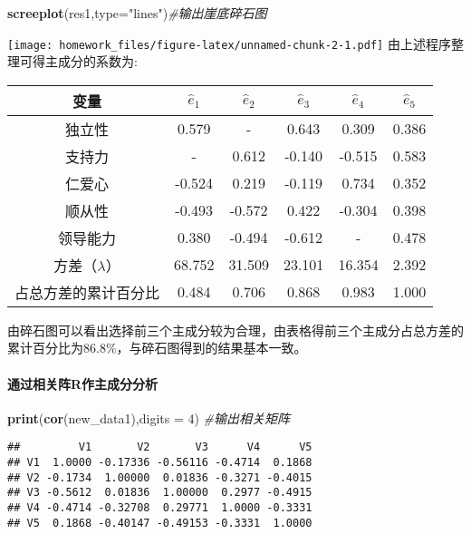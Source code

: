 \documentclass[
]{article}
\newenvironment{Shaded}{\begin{snugshade}}{\end{snugshade}}
\newcommand{\CommentTok}[1]{\textcolor[rgb]{0.56,0.35,0.01}{\textit{#1}}}
\newcommand{\DataTypeTok}[1]{\textcolor[rgb]{0.13,0.29,0.53}{#1}}
\newcommand{\DecValTok}[1]{\textcolor[rgb]{0.00,0.00,0.81}{#1}}
\newcommand{\KeywordTok}[1]{\textcolor[rgb]{0.13,0.29,0.53}{\textbf{#1}}}
\newcommand{\NormalTok}[1]{#1}
\newcommand{\StringTok}[1]{\textcolor[rgb]{0.31,0.60,0.02}{#1}}
\begin{document}
\begin{Shaded}
\begin{Highlighting}[]
\KeywordTok{screeplot}\NormalTok{(res1,}\DataTypeTok{type=}\StringTok{"lines"}\NormalTok{)}\CommentTok{#输出崖底碎石图}
\end{Highlighting}
\end{Shaded}

\texttt{[image: homework\_files/figure-latex/unnamed-chunk-2-1.pdf]}
由上述程序整理可得主成分的系数为:

\begin{longtable}[]{@{}cccccc@{}}
\toprule
变量 & \(\hat{e}_{1}\) & \(\hat{e}_{2}\) & \(\hat{e}_{3}\) & \(\hat{e}_{4}\) &
\(\hat{e}_{5}\)\tabularnewline
\midrule
\endhead
独立性 & 0.579 & - & 0.643 & 0.309 & 0.386\tabularnewline
支持力 & - & 0.612 & -0.140 & -0.515 & 0.583\tabularnewline
仁爱心 & -0.524 & 0.219 & -0.119 & 0.734 & 0.352\tabularnewline
顺从性 & -0.493 & -0.572 & 0.422 & -0.304 & 0.398\tabularnewline
领导能力 & 0.380 & -0.494 & -0.612 & - & 0.478\tabularnewline
方差（$\hat{\lambda} $） & 68.752 & 31.509 & 23.101 & 16.354 &
2.392\tabularnewline
占总方差的累计百分比 & 0.484 & 0.706 & 0.868 & 0.983 &
1.000\tabularnewline
\bottomrule
\end{longtable}

由碎石图可以看出选择前三个主成分较为合理，由表格得前三个主成分占总方差的累计百分比为86.8\%，与碎石图得到的结果基本一致。

\hypertarget{ux901aux8fc7ux76f8ux5173ux9635rux4f5cux4e3bux6210ux5206ux5206ux6790}{%
\paragraph{通过相关阵R作主成分分析}\label{ux901aux8fc7ux76f8ux5173ux9635rux4f5cux4e3bux6210ux5206ux5206ux6790}}

\begin{Shaded}
\begin{Highlighting}[]
\KeywordTok{print}\NormalTok{(}\KeywordTok{cor}\NormalTok{(new_data1),}\DataTypeTok{digits =} \DecValTok{4}\NormalTok{) }\CommentTok{#输出相关矩阵}
\end{Highlighting}
\end{Shaded}

\begin{verbatim}
##         V1       V2       V3      V4      V5
## V1  1.0000 -0.17336 -0.56116 -0.4714  0.1868
## V2 -0.1734  1.00000  0.01836 -0.3271 -0.4015
## V3 -0.5612  0.01836  1.00000  0.2977 -0.4915
## V4 -0.4714 -0.32708  0.29771  1.0000 -0.3331
## V5  0.1868 -0.40147 -0.49153 -0.3331  1.0000
\end{verbatim}
\end{document}
